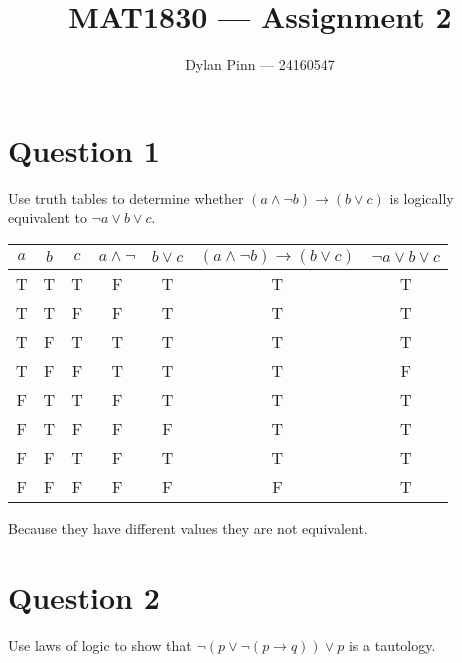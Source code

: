 \documentclass[11pt]{article}
\begin{document}
\title{MAT1830 --- Assignment 2}
\author{Dylan Pinn --- 24160547}
\maketitle

\section*{Question 1}
Use truth tables to determine whether $(a \land \neg b) \to (b \lor c)$ is logically equivalent to $\neg a \lor b \lor c$.

\begin{tabular}{|c|c|c|c|c|c|c|}
\hline
$a$ & $b$ & $c$ & $a \land \neg $ & $b \lor c$ & $(a \land \neg b) \to (b \lor c)$ & $\neg a \lor b \lor c$ \\ \hline
T & T & T & F & T & T & T \\ \hline
T & T & F & F & T & T & T \\ \hline
T & F & T & T & T & T & T \\ \hline
T & F & F & T & T & T & F \\ \hline
F & T & T & F & T & T & T \\ \hline
F & T & F & F & F & T & T \\ \hline
F & F & T & F & T & T & T \\ \hline
F & F & F & F & F & F & T \\ \hline
\end{tabular}

Because they have different values they are not equivalent.

\break

\section*{Question 2}
Use laws of logic to show that $\neg (p \lor \neg (p \to q)) \lor p$ is a tautology.
\end{document}
